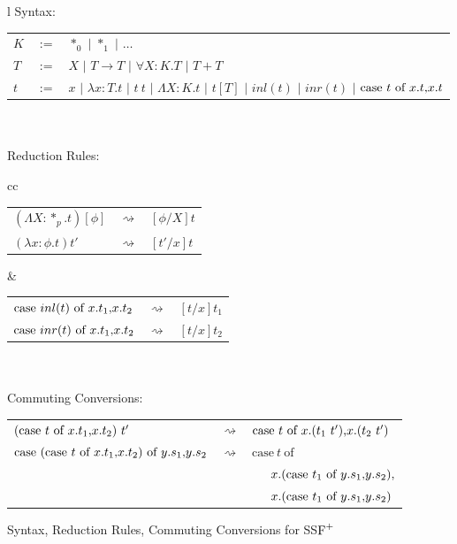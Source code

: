\begin{figure}
  \begin{center}
    \begin{tabular}{l}
      Syntax:\\
      \begin{tabular}{lll}
        $K$ & $:=$ & $*_0$ $|$ $*_1$             $|$ $\ldots$\\
        $T$ & $:=$ & $X$   $|$ $T \rightarrow T$ $|$ $\forall X:K.T$  $|$ $T + T$\\
        $t$ & $:=$ & $x$   $|$ $\lambda x:T.t$   $|$ $t\ t$ $|$ 
        $\Lambda X:K.t$ $|$ $t[T]$ $|$ $inl(t)$ $|$ $inr(t)$ $|$ $\mbox{case}\ t\ \text{of}\ x\text{.}t\text{,}x\text{.}t$\\
      \end{tabular}
      \\ \\
      Reduction Rules:\\
      \begin{tabular}{cc}
        \begin{tabular}{lll}
          $(\Lambda X:*_p.t)[\phi]$ & $\rightsquigarrow$ & $[\phi/X]t$\\
          $(\lambda x:\phi.t)t'$    & $\rightsquigarrow$ & $[t'/x]t$\\
        \end{tabular}
        &
        \begin{tabular}{lll}
          $\mbox{case}\ inl(t)\ \text{of}\ x\text{.}t_1\text{,}x\text{.}t_2$ & $\rightsquigarrow$ & $[t/x]t_1$\\
          $\mbox{case}\ inr(t)\ \text{of}\ x\text{.}t_1\text{,}x\text{.}t_2$ & $\rightsquigarrow$ & $[t/x]t_2$
        \end{tabular}
      \end{tabular}
      \\ \\
      Commuting Conversions:\\
      \begin{tabular}{lll}
        $(\mbox{case}\ t\ \text{of}\ x\text{.}t_1\text{,}x\text{.}t_2)\ t'$ & $\rightsquigarrow$ & 
        $\mbox{case}\ t\ \text{of}\ x\text{.}(t_1\ t')\text{,}x\text{.}(t_2\ t')$\\
        $\mbox{case}\ (\mbox{case}\ t\ \text{of}\ x\text{.}t_1\text{,}x\text{.}t_2)\ \text{of}\ y\text{.}s_1\text{,}y\text{.}s_2$ & $\rightsquigarrow$ & 
        $\mbox{case}\ t\ \mbox{of}\ $\\
        &                    & \ \ \ $x.(\mbox{case}\ t_1\ \text{of}\ y\text{.}s_1\text{,}y\text{.}s_2),$\\
        &                    & \ \ \ $x.(\mbox{case}\ t_1\ \text{of}\ y\text{.}s_1\text{,}y\text{.}s_2)$
      \end{tabular}
    \end{tabular}
  \end{center}
  
  \caption[]{Syntax, Reduction Rules, Commuting Conversions for SS$\mbox{F}^{+}$}
  \label{fig:syntax_ssfp}
\end{figure}


